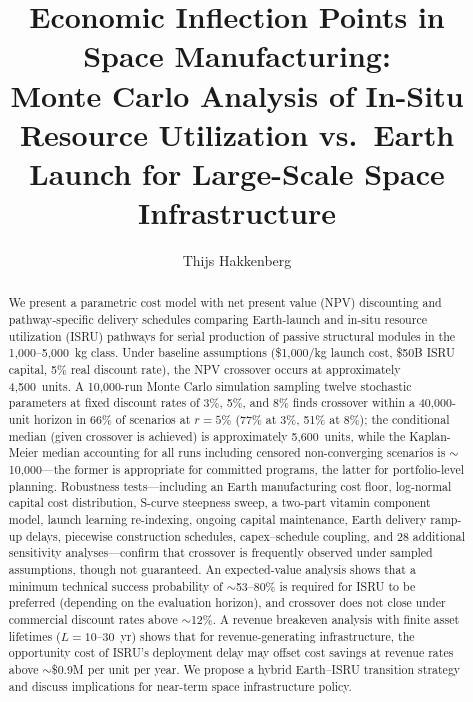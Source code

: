 \documentclass[preprint,12pt]{elsarticle}
\begin{document}
\begin{frontmatter}

\title{Economic Inflection Points in Space Manufacturing:\\ Monte Carlo Analysis of In-Situ Resource Utilization vs.\ Earth Launch for Large-Scale Space Infrastructure}

\author[dyson]{Thijs Hakkenberg}

\address[dyson]{Project Dyson, Open Research Initiative}

\begin{abstract}
We present a parametric cost model with net present value (NPV) discounting and pathway-specific delivery schedules comparing Earth-launch and in-situ resource utilization (ISRU) pathways for serial production of passive structural modules in the 1{,}000--5{,}000~kg class. Under baseline assumptions (\$1{,}000/kg launch cost, \$50B ISRU capital, 5\% real discount rate), the NPV crossover occurs at approximately 4{,}500~units. A 10{,}000-run Monte Carlo simulation sampling twelve stochastic parameters at fixed discount rates of 3\%, 5\%, and 8\% finds crossover within a 40{,}000-unit horizon in 66\% of scenarios at $r = 5\%$ (77\% at 3\%, 51\% at 8\%); the conditional median (given crossover is achieved) is approximately 5{,}600~units, while the Kaplan-Meier median accounting for all runs including censored non-converging scenarios is $\sim$10{,}000---the former is appropriate for committed programs, the latter for portfolio-level planning. Robustness tests---including an Earth manufacturing cost floor, log-normal capital cost distribution, S-curve steepness sweep, a two-part vitamin component model, launch learning re-indexing, ongoing capital maintenance, Earth delivery ramp-up delays, piecewise construction schedules, capex--schedule coupling, and 28 additional sensitivity analyses---confirm that crossover is frequently observed under sampled assumptions, though not guaranteed. An expected-value analysis shows that a minimum technical success probability of $\sim$53--80\% is required for ISRU to be preferred (depending on the evaluation horizon), and crossover does not close under commercial discount rates above $\sim$12\%. A revenue breakeven analysis with finite asset lifetimes ($L = 10$--$30$~yr) shows that for revenue-generating infrastructure, the opportunity cost of ISRU's deployment delay may offset cost savings at revenue rates above $\sim$\$0.9M per unit per year. We propose a hybrid Earth--ISRU transition strategy and discuss implications for near-term space infrastructure policy.
\end{abstract}


\end{frontmatter}
\end{document}

